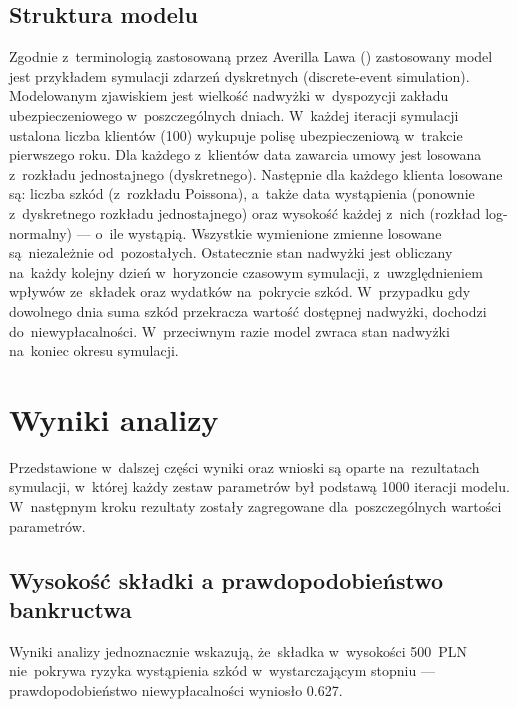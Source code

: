 \documentclass[12pt, a4paper, oneside]{mwart} %
\begin{document}
\subsection{Struktura modelu}
Zgodnie z~terminologią zastosowaną przez Averilla Lawa (\cite{law}) zastosowany model jest przykładem symulacji zdarzeń dyskretnych (discrete-event simulation). Modelowanym zjawiskiem jest wielkość nadwyżki w~dyspozycji zakładu ubezpieczeniowego w~poszczególnych dniach. W~każdej iteracji symulacji ustalona liczba klientów (100) wykupuje polisę ubezpieczeniową w~trakcie pierwszego roku. Dla każdego z~klientów data zawarcia umowy jest losowana z~rozkładu jednostajnego (dyskretnego). Następnie dla każdego klienta losowane są: liczba szkód (z~rozkładu Poissona), a~także data wystąpienia (ponownie z~dyskretnego rozkładu jednostajnego) oraz wysokość każdej z~nich (rozkład log-normalny) --- o~ile wystąpią. Wszystkie wymienione zmienne losowane są~niezależnie od~pozostałych. Ostatecznie stan nadwyżki jest obliczany na~każdy kolejny dzień w~horyzoncie czasowym symulacji, z~uwzględnieniem wpływów ze~składek oraz wydatków na~pokrycie szkód. W~przypadku gdy dowolnego dnia suma szkód przekracza wartość dostępnej nadwyżki, dochodzi do~niewypłacalności. W~przeciwnym razie model zwraca stan nadwyżki na~koniec okresu symulacji. 

\section{Wyniki analizy}
Przedstawione w~dalszej części wyniki oraz wnioski są oparte na~rezultatach symulacji, w~której każdy zestaw parametrów był podstawą 1000 iteracji modelu. W~następnym kroku rezultaty zostały zagregowane dla~poszczególnych wartości parametrów.

\subsection{Wysokość składki a prawdopodobieństwo bankructwa}
Wyniki analizy jednoznacznie wskazują, że~składka w~wysokości 500~PLN nie~pokrywa ryzyka wystąpienia szkód w~wystarczającym stopniu --- prawdopodobieństwo niewypłacalności wyniosło 0.627.
\end{document}
